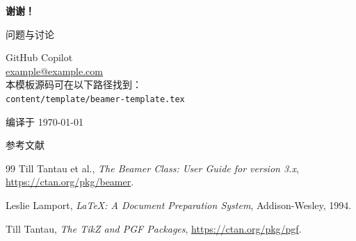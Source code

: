 \documentclass[UTF8,11pt,aspectratio=169]{beamer}
\newcommand{\latex}{\LaTeX}                  %
\begin{document}
\begin{frame}[plain]  %
    \centering
    \vspace{2cm}

    {\Huge \textbf{谢谢！}}  %

    \vspace{1cm}
    {\Large 问题与讨论}

    \vspace{1.5cm}
    {\normalsize
        GitHub Copilot \\
        \href{mailto:example@example.com}{example@example.com} \\
        \vspace{0.3cm}
        本模板源码可在以下路径找到：\\
        \texttt{content/template/beamer-template.tex}
    }

    \vspace{1cm}
    {\small 编译于 \today}
\end{frame}

\appendix

\begin{frame}[allowframebreaks]{参考文献}
    \begin{thebibliography}{99}
         Till Tantau et al.,
            \emph{The Beamer Class: User Guide for version 3.x},
            \url{https://ctan.org/pkg/beamer}.

         Leslie Lamport,
            \emph{\latex: A Document Preparation System},
            Addison-Wesley, 1994.

         Till Tantau,
            \emph{The TikZ and PGF Packages},
            \url{https://ctan.org/pkg/pgf}.
    \end{thebibliography}
\end{frame}
\end{document}
